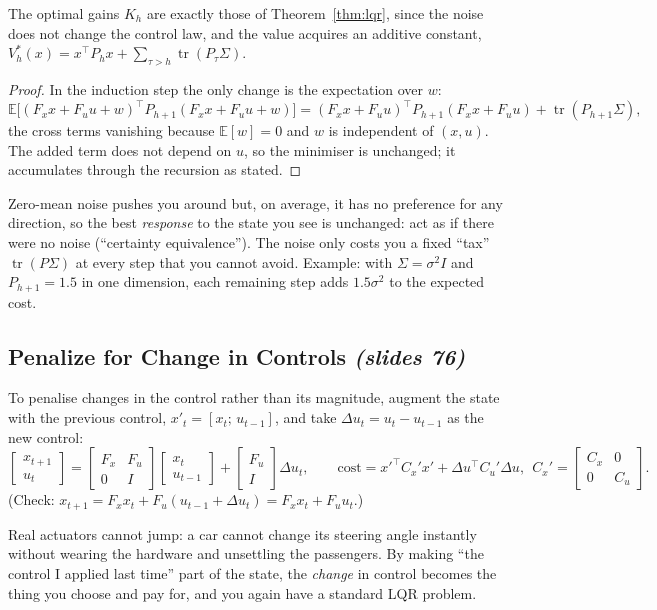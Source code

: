 \documentclass[11pt,a4paper]{article}
\newcommand{\E}{\mathbb{E}}
\newcommand{\tr}{\operatorname{tr}}
\newcommand{\slides}[1]{\emph{(slides #1)}}
\theoremstyle{plain}
\theoremstyle{definition}
\theoremstyle{remark}
\begin{document}
\begin{proposition}\label{prop:ce}
The optimal gains $K_h$ are exactly those of Theorem~\ref{thm:lqr}, since the noise does not change the control law, and the value acquires an additive constant, $V^*_h(x)=x^\top P_hx+\sum_{\tau>h}\tr(P_\tau\Sigma)$.
\end{proposition}
\begin{proof}
In the induction step the only change is the expectation over $w$:
\[
\E\big[(F_xx+F_uu+w)^\top P_{h+1}(F_xx+F_uu+w)\big]=(F_xx+F_uu)^\top P_{h+1}(F_xx+F_uu)+\tr(P_{h+1}\Sigma),
\]
the cross terms vanishing because $\E[w]=0$ and $w$ is independent of $(x,u)$. The added term does not depend on $u$, so the minimiser is unchanged; it accumulates through the recursion as stated.
\end{proof}
\begin{intuition}
Zero-mean noise pushes you around but, on average, it has no preference for any direction, so the best \emph{response} to the state you see is unchanged: act as if there were no noise (``certainty equivalence''). The noise only costs you a fixed ``tax'' $\tr(P\Sigma)$ at every step that you cannot avoid. Example: with $\Sigma=\sigma^2I$ and $P_{h+1}=1.5$ in one dimension, each remaining step adds $1.5\sigma^2$ to the expected cost.
\end{intuition}

\subsection{Penalize for Change in Controls \slides{76}}

To penalise changes in the control rather than its magnitude, augment the state with the previous control, $x'_t=[x_t;\,u_{t-1}]$, and take $\Delta u_t=u_t-u_{t-1}$ as the new control:
\[
\begin{bmatrix}x_{t+1}\\u_t\end{bmatrix}=\begin{bmatrix}F_x&F_u\\0&I\end{bmatrix}\begin{bmatrix}x_t\\u_{t-1}\end{bmatrix}+\begin{bmatrix}F_u\\I\end{bmatrix}\Delta u_t,\qquad
\text{cost}=x'^\top C_x'x'+\Delta u^\top C_u'\Delta u,\ \ C_x'=\begin{bmatrix}C_x&0\\0&C_u\end{bmatrix}.
\]
(Check: $x_{t+1}=F_xx_t+F_u(u_{t-1}+\Delta u_t)=F_xx_t+F_uu_t$.)
\begin{intuition}
Real actuators cannot jump: a car cannot change its steering angle instantly without wearing the hardware and unsettling the passengers. By making ``the control I applied last time'' part of the state, the \emph{change} in control becomes the thing you choose and pay for, and you again have a standard LQR problem.
\end{intuition}
\end{document}
